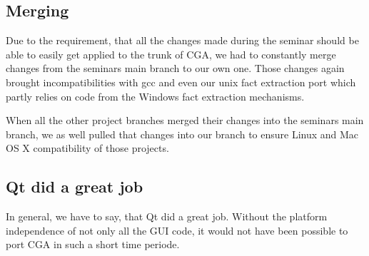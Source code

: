 \subsection{Merging} Due to the requirement, that all the changes made during the seminar should be able to easily get applied to the trunk of CGA, we had to constantly merge changes from the seminars main branch to our own one. Those changes again brought incompatibilities with gcc and even our unix fact extraction port which partly relies on code from the Windows fact extraction mechanisms.

When all the other project branches merged their changes into the seminars main branch, we as well pulled that changes into our branch to ensure Linux and Mac OS X compatibility of those projects.

\subsection{Qt did a great job} In general, we have to say, that Qt did a great job. Without the platform independence of not only all the GUI code, it would not have been possible to port CGA in such a short time periode. 
